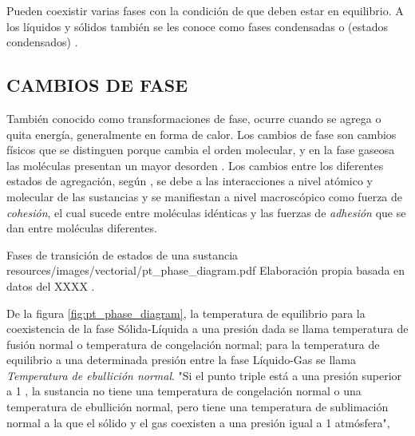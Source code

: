   Pueden coexistir varias fases con la condición de que deben estar en equilibrio. A los líquidos y sólidos también se les conoce como fases condensadas o (estados condensados) \parencite[p. 430]{bib:SilberberglQmcGeneral}. 


\subsection{CAMBIOS DE FASE}
    También conocido como transformaciones de fase, ocurre cuando se agrega o quita energía, generalmente en forma de calor. Los cambios de fase son cambios físicos que se distinguen porque  cambia el orden molecular, y en la fase gaseosa las moléculas presentan un mayor desorden \parencite[p. 489]{bib:ChangQmc2010}. Los cambios entre los diferentes estados de agregación, según \parencite{bib:ReyesChumacero2012}, se debe a las interacciones a nivel atómico y molecular de las sustancias y se manifiestan a nivel macroscópico como fuerza de {\it cohesión}, el cual sucede entre moléculas idénticas y las fuerzas de {\it adhesión} que se dan entre moléculas diferentes.


              {Fases de transición de estados de una sustancia}
              {resources/images/vectorial/pt_phase_diagram.pdf}
              {Elaboración propia basada en datos del XXXX .}


De la figura \ref{fig:pt_phase_diagram}, la temperatura de equilibrio para la coexistencia de la fase Sólida-Líquida a una presión dada se llama temperatura de fusión normal o temperatura de congelación normal; para la temperatura de equilibrio a una determinada presión entre la fase Líquido-Gas se llama {\it Temperatura de ebullición normal}. "Si el punto triple está a una presión superior a 1 , la sustancia no tiene una temperatura de congelación normal o una temperatura de ebullición normal, pero tiene una temperatura de sublimación normal a la que el sólido y el gas coexisten a una presión igual a 1 atmósfera", \parencite[pp. 28]{bib:Mortimer2008} %


